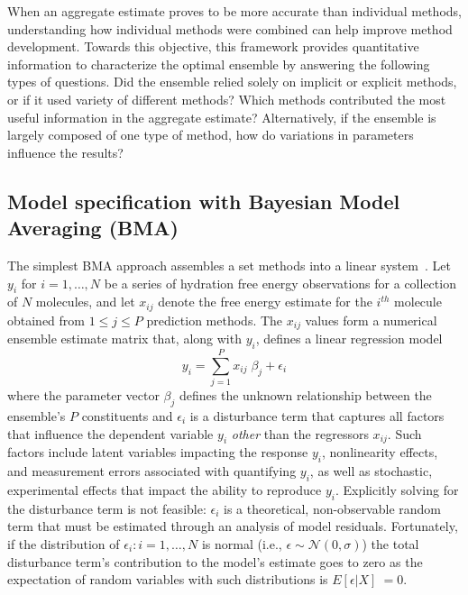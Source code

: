 \documentclass[journal=jpcbfk, manuscript=article]{achemso}
\newcommand{\+}[1]{\ensuremath{\mathbf{#1}}}
\newcommand{\rev}[1]{#1}
\begin{document}
\rev{When an aggregate estimate proves to be more accurate than individual methods, understanding how individual methods were combined can help improve method development.
Towards this objective, this framework provides quantitative information to characterize the optimal ensemble by answering the following types of questions.
Did the ensemble relied solely on implicit or explicit methods, or if it used variety of different methods?
Which methods contributed the most useful information in the aggregate estimate?
Alternatively, if the ensemble is largely composed of one type of method, how do variations in parameters influence the results?}

\subsection{Model specification with Bayesian Model Averaging (BMA)} \label{Method} 

\rev{The simplest BMA approach assembles a set methods into a linear system}~\cite{Hoeting:1999,Raftery:1998,Raftery:1995}.  
Let $y_i$ for $i = 1, \ldots, N$ be a series of hydration free energy observations for a collection of $N$ molecules, and let $x_{i j}$ denote the \rev{free energy estimate for the $i^{th}$ molecule} obtained from \rev{$1 \leq j \leq P$ prediction methods. 
The $x_{ij}$ values form a numerical ensemble estimate matrix} that, along with $y_i$, defines a linear regression model 
\begin{equation}
	\label{Method:E1}
	y_i = \sum_{j=1}^P x_{ij} \;\beta_j + \epsilon_i
\end{equation}
\rev{where the parameter vector $\beta_j$ defines the unknown relationship between the ensemble's $P$ constituents and $\epsilon_i$ is a disturbance term that captures all factors that influence the dependent variable $y_i$ \emph{other} than the regressors $x_{ij}$.
Such factors include latent variables impacting the response $y_i$, nonlinearity effects, and measurement errors associated with quantifying $y_i$, as well as stochastic, experimental effects that impact the ability to reproduce $y_i$.  
Explicitly solving for the disturbance term is not feasible: $\epsilon_i$ is a theoretical, non-observable random term that must be estimated through an analysis of model residuals.  
Fortunately, if the distribution of $\epsilon_i: i=1,\ldots,N$ is normal (i.e., $\epsilon \sim \mathcal{N}(0,\sigma)$) the total disturbance term's contribution to the model's estimate goes to zero as the expectation of random variables with such distributions is $E [\epsilon | X]\ = 0$.}
\end{document}
